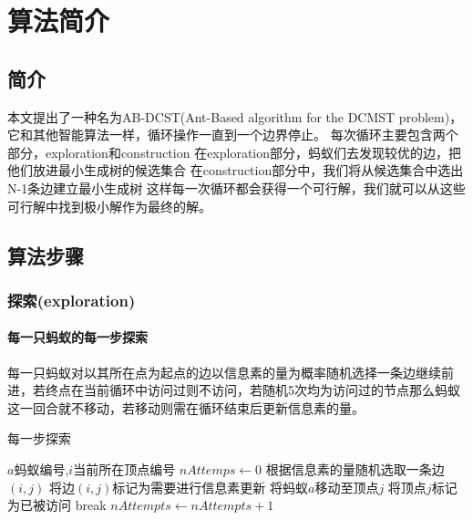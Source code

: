
\chapter{算法简介}

\section{简介}
本文提出了一种名为AB-DCST(Ant-Based algorithm for the DCMST problem)，它和其他智能算法一样，循环操作一直到一个边界停止。
每次循环主要包含两个部分，exploration和construction
在exploration部分，蚂蚁们去发现较优的边，把他们放进最小生成树的候选集合
在construction部分中，我们将从候选集合中选出N-1条边建立最小生成树
这样每一次循环都会获得一个可行解，我们就可以从这些可行解中找到极小解作为最终的解。



\section{算法步骤}

\subsection{探索(exploration)}
\subsubsection{每一只蚂蚁的每一步探索}
每一只蚂蚁对以其所在点为起点的边以信息素的量为概率随机选择一条边继续前进，若终点在当前循环中访问过则不访问，若随机5次均为访问过的节点那么蚂蚁这一回合就不移动，若移动则需在循环结束后更新信息素的量。
\vspace{0.6cm}
\begin{breakablealgorithm}
    \caption{每一步探索}
    \begin{algorithmic}[1]
        \Require $a$蚂蚁编号,$i$当前所在顶点编号
            \State $nAttemps\gets 0$
                \State 根据信息素的量随机选取一条边$(i,j)$
                    \State 将边$(i,j)$标记为需要进行信息素更新
                    \State 将蚂蚁$a$移动至顶点$j$
                    \State 将顶点$j$标记为已被访问
                    \State break
                \Else
                    \State $nAttempts \gets nAttempts+1$
                \EndIf
            \EndWhile
        \EndFunction
    \end{algorithmic}
\end{breakablealgorithm}

